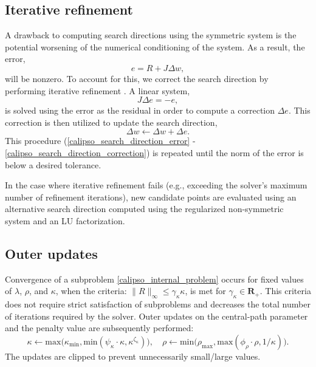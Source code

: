 \subsection{Iterative refinement} \label{calipso_iterative_refinement_appendix}
A drawback to computing search directions using the symmetric system is the potential worsening of the numerical conditioning of the system. As a result, the error, 
\begin{equation} 
	e = R + J \Delta w, \label{calipso_search_direction_error}
\end{equation}
will be nonzero. To account for this, we correct the search direction by performing iterative refinement \cite{nocedal2006numerical}. A linear system, 
\begin{equation}
	J \Delta e = -e,
\end{equation}
is solved using the error as the residual in order to compute a correction $\Delta e$. This correction is then utilized to update the search direction, 
\begin{equation} 
	\Delta w \leftarrow \Delta w + \Delta e. \label{calipso_search_direction_correction}
\end{equation}
This procedure (\ref{calipso_search_direction_error} - \ref{calipso_search_direction_correction}) is repeated until the norm of the error is below a desired tolerance. 

In the case where iterative refinement fails (e.g., exceeding the solver's maximum number of refinement iterations), new candidate points are evaluated using an alternative search direction computed using the regularized non-symmetric system and an LU factorization.

\subsection{Outer updates}
Convergence of a subproblem \eqref{calipso_internal_problem} occurs for fixed values of $\lambda$, $\rho$, and $\kappa$, when the criteria: $\| R \|_{\infty} \leq \gamma_{\kappa} \kappa$,
is met for $\gamma_{\kappa} \in \mathbf{R}_+$. This criteria does not require strict satisfaction of subproblems and decreases the total number of iterations required by the solver. Outer updates on the central-path parameter and the penalty value are subsequently performed:
\begin{equation}
	\kappa \leftarrow  \mbox{max}\Big(\kappa_{\mbox{min}}, \mbox{min}(\psi_{\kappa} \cdot \kappa, \kappa^{\zeta_{\kappa}})\Big), \quad
	\rho \leftarrow \mbox{min}\Big(\rho_{\mbox{max}}, \mbox{max}(\phi_{\rho} \cdot \rho, 1 / \kappa) \Big). \label{calipso_outer_update}
\end{equation}
The updates are clipped to prevent unnecessarily small/large values.

